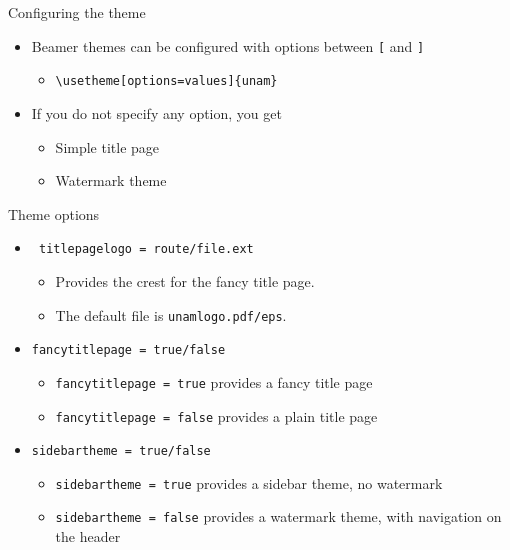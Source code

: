 \begin{frame}[t,fragile]{Configuring the theme}
\begin{itemize}
\item Beamer themes can be configured with options between \verb![! and
      \verb!]!
  \begin{itemize}
  \item \verb!\usetheme[options=values]{unam}!
  \end{itemize}
\item If you do not specify any option, you get
  \begin{itemize}
  \item Simple title page
  \item Watermark theme
  \end{itemize}
\end{itemize}
\end{frame}


\begin{frame}{Theme options}
\begin{itemize}
\item \verb! titlepagelogo = route/file.ext!
    \begin{itemize}
        \item Provides the crest for the fancy title page.
        \item The default file is \verb!unamlogo.pdf/eps!.
    \end{itemize}
\item \verb!fancytitlepage = true/false!
    \begin{itemize}
    \item \verb!fancytitlepage = true! provides a fancy title page
    \item \verb!fancytitlepage = false! provides a plain title page
    \end{itemize}
\item \verb!sidebartheme = true/false!
\begin{itemize}
    \item \verb!sidebartheme = true! provides a sidebar theme, no watermark
    \item \verb!sidebartheme = false! provides a watermark theme, with navigation on the header
    \end{itemize}
\end{itemize}
\end{frame}


